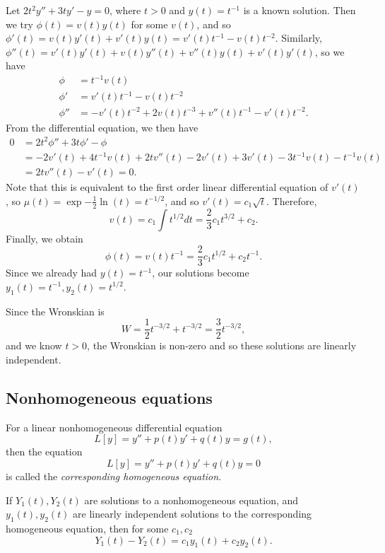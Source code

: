 \begin{exmp}
    Let $2t^2y'' + 3ty' - y = 0$, where $t > 0$ and $y(t) = t^{-1}$ is a known solution. Then we try $\phi(t) = v(t)y(t)$ for some $v(t)$, and so $\phi'(t) = v(t)y'(t) + v'(t)y(t) = v'(t)t^{-1} - v(t)t^{-2}$. Similarly, $\phi''(t) = v'(t)y'(t) + v(t)y''(t) + v''(t)y(t) + v'(t)y'(t)$, so we have
    \begin{align*}
        \phi &= t^{-1}v(t) \\
        \phi' &= v'(t)t^{-1} - v(t)t^{-2} \\
        \phi'' &= -v'(t)t^{-2} + 2v(t)t^{-3} + v''(t)t^{-1} - v'(t)t^{-2}.
    \end{align*}
    From the differential equation, we then have
    \begin{align*}
        0 &= 2t^2\phi'' + 3t\phi' - \phi \\
        &= -2v'(t) + 4t^{-1}v(t) + 2tv''(t) - 2v'(t) + 3v'(t) - 3t^{-1}v(t) - t^{-1}v(t) \\
        &= 2tv''(t)-v'(t) = 0.
    \end{align*}
    Note that this is equivalent to the first order linear differential equation of $v'(t)$, so $\mu(t) = \exp{-\frac{1}{2}\ln(t)} = t^{-1/2}$, and so $v'(t) = c_1\sqrt{t}$. Therefore,
    \[v(t) = c_1\int t^{1/2}dt = \frac{2}{3}c_1t^{3/2} + c_2.\] Finally, we obtain
    \[\phi(t) = v(t)t^{-1} = \frac{2}{3}c_1t^{1/2} + c_2t^{-1}.\] Since we already had $y(t) = t^{-1}$, our solutions become $y_1(t) = t^{-1}, y_2(t) = t^{1/2}$.

    Since the Wronskian is
    \[W = \frac{1}{2}t^{-3/2} + t^{-3/2} = \frac{3}{2}t^{-3/2},\] and we know $t > 0$, the Wronskian is non-zero and so these solutions are linearly independent.
\end{exmp}

\subsection{Nonhomogeneous equations}

\begin{defn}
    For a linear nonhomogeneous differential equation
    \[L[y] = y'' + p(t)y' + q(t)y = g(t),\] then the equation
    \[L[y] = y'' + p(t)y' + q(t)y = 0\] is called the \emph{corresponding homogeneous equation}.
\end{defn}

\begin{thm}\label{linear-second-order-nonhomogeneous-difference}
    If $Y_1(t), Y_2(t)$ are solutions to a nonhomogeneous equation, and $y_1(t), y_2(t)$ are linearly independent solutions to the corresponding homogeneous equation, then for some $c_1, c_2$
    \[Y_1(t) - Y_2(t) = c_1y_1(t) + c_2y_2(t).\]
\end{thm}

